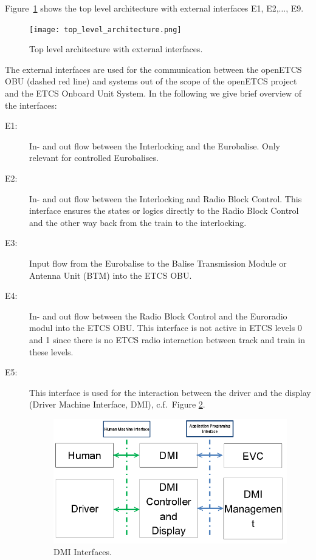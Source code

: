Figure~\ref{f:top_level} shows the top level architecture with external interfaces E1, E2,$\ldots$, E9.
\begin{figure}
\centering
\texttt{[image: top\_level\_architecture.png]}
\caption{Top level architecture with external interfaces.}
\label{f:top_level}
\end{figure}
The external interfaces are used for the communication between the openETCS OBU (dashed red line) and systems out of the scope of the openETCS project and the ETCS Onboard Unit System. In the following we give  brief overview of the interfaces:
\begin{description}
\item[E1:] In- and out flow between the Interlocking and the Eurobalise. Only relevant for controlled Eurobalises.

\item[E2:] In- and out flow between the Interlocking and Radio Block Control.
This interface ensures the states or logics directly to the Radio Block Control and the other way back from the train to the interlocking.

\item[E3:] Input flow from the Eurobalise to the Balise Transmission Module or Antenna Unit (BTM) into the ETCS OBU.

\item[E4:] In- and out flow between the Radio Block Control and the Euroradio modul into the ETCS OBU. This interface is not active in ETCS levels 0 and 1 since there is no ETCS radio interaction between track and train in these levels.

\item[E5:] This interface is used for the interaction between the driver and the display (Driver Machine Interface, DMI), c.f.~Figure \ref{DMI Interfaces}.
\begin{figure}
\centering
\includegraphics[scale=0.5]{images/DMIinterfaces}
\caption{DMI Interfaces.}
\label{DMI Interfaces}
\end{figure}


\end{description}
